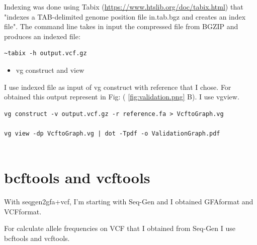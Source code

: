 Indexing was done using Tabix (\url{https://www.htslib.org/doc/tabix.html}) that "indexes a TAB-delimited genome position file in.tab.bgz and creates an index file". 
The command line takes in input the compressed file from BGZIP and produces an indexed file: 

\begin{verbatim}
~tabix -h output.vcf.gz  
\end{verbatim}

\begin{itemize}
\item  vg construct and view
\end{itemize}
I use indexed file as input of vg construct with reference that I chose. For obtained this output represent in Fig: ( \ref{fig:validation.png} B). I use vgview.

\begin{verbatim}
vg construct -v output.vcf.gz -r reference.fa > VcftoGraph.vg

vg view -dp VcftoGraph.vg | dot -Tpdf -o ValidationGraph.pdf


\end{verbatim}

\section{bcftools and vcftools}

With seqgen2gfa+vcf, I'm starting with Seq-Gen and I obtained GFAformat and VCFformat. 

For calculate allele frequencies on VCF that I obtained from Seq-Gen I use bcftools and vcftools.

